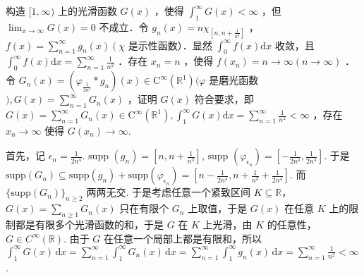 \begin{exercise}
构造 $[1, \infty)$ 上的光滑函数 $G(x)$ ，使得 $\int_1^{\infty} G(x)<\infty$ ，但 $\lim _{x \rightarrow \infty} G(x)=0$ 不成立．令 $g_n(x)=n \chi_{\left[n, n+\frac{1}{n^3}\right]}$ ， $f(x)=\sum_{n=1}^{\infty} g_n(x)\left(\chi\right.$ 是示性函数）．显然 $\int_0^{\infty} f(x) \mathrm{d} x$ 收敛，且 $\int_0^{\infty} f(x) \mathrm{d} x=\sum_{n=1}^{\infty} \frac{1}{n^2}$ ．存在 $x_n=n$ ，使得 $f\left(x_n\right)=n \rightarrow \infty(n \rightarrow \infty)$ ．令 $G_n(x)=\left(\varphi_{\frac{1}{2 n^4}} * g_n\right)(x) \in \mathrm{C}^{\infty}\left(\mathbb{R}^1\right)(\varphi$ 是磨光函数 $), G(x)=\sum_{n=1}^{\infty} G_n(x)$ ，证明 $G(x)$ 符合要求，即 $G(x)=\sum_{n=1}^{\infty} G_n(x) \in \mathrm{C}^{\infty}\left(\mathbb{R}^1\right), \int_1^{\infty} G(x) \mathrm{d} x=\sum_{n=1}^{\infty} \frac{1}{n^2}<\infty$ ，存在 $x_n \rightarrow \infty$ 使得 $G\left(x_n\right) \rightarrow \infty$.
\end{exercise}
首先，记 $\epsilon _n=\frac{1}{2n^{4}}$. $\text{supp }(g_n)=\left[ n,n+\frac{1}{n^{3}} \right]$, $\text{supp }(\varphi_{\epsilon _n})=\left[ -\frac{1}{2n^{4}},\frac{1}{2n^{4}} \right]$. 于是 $\text{supp}(G_n)\subseteq\text{supp}(g_n)+\text{supp}(\varphi_{\epsilon _n})=\left[ n-\frac{1}{2n^{4}}, n+\frac{1}{n^{3}}+\frac{1}{2n^{4}} \right]$. 而 $\{ \text{supp}(G_n) \}_{n\geq2}$ 两两无交. 于是考虑任意一个紧致区间 $K\subseteq \mathbb{R}$，$G(x)=\sum_{n\geq1}G_n(x)$ 只在有限个 $G_n$ 上取值，于是 $G(x)$ 在任意 $K$ 上的限制都是有限多个光滑函数的和，于是 $G$ 在 $K$ 上光滑，由 $K$ 的任意性，$G\in C^{\infty}(\mathbb{R})$. 由于 $G$ 在任意一个局部上都是有限和，所以 $\int_{1}^{\infty} G(x) \, \mathrm{d}x=\sum_{n=1}^{\infty}\int_{1}^{\infty} G_n(x) \, \mathrm{d}x=\sum_{n=1}^{\infty}\int_{1}^{\infty} g_n(x) \, \mathrm{d}x=\sum_{n=1}^{\infty}\frac{1}{n^{2}}<\infty$.

